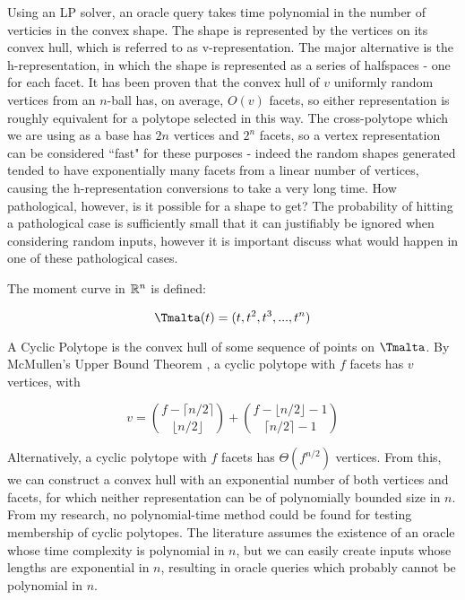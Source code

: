 Using an LP solver, an oracle query takes time polynomial in the number of verticies in the convex shape. The shape is represented by the vertices on its convex hull, which is referred to as v-representation. The major alternative is the h-representation, in which the shape is represented as a series of halfspaces - one for each facet. It has been proven \cite{Buchta85} that the convex hull of $v$ uniformly random vertices from an $n$-ball has, on average, $O(v)$ facets, so either representation is roughly equivalent for a polytope selected in this way. The cross-polytope which we are using as a base has $2n$ vertices and $2^n$ facets, so a vertex representation can be considered ``fast" for these purposes - indeed the random shapes generated tended to have exponentially many facets from a linear number of vertices, causing the h-representation conversions to take a very long time. How pathological, however, is it possible for a shape to get? The probability of hitting a pathological case is sufficiently small that it can justifiably be ignored when considering random inputs, however it is important discuss what would happen in one of these pathological cases.

The moment curve in $\mathbb{R}^n$ is defined:

$$
\tengm(t) = (t, t^2, t^3, ..., t^n)
$$

A Cyclic Polytope is the convex hull of some sequence of points on $\tengm$. By McMullen's Upper Bound Theorem \cite{McMullen70}, a cyclic polytope with $f$ facets has $v$ vertices, with

$$
v = {{f-\lceil n/2 \rceil}\choose{\lfloor {n/2} \rfloor}} + {{f-\lfloor n/2 \rfloor -1} \choose {\lceil {n/2} \rceil - 1}}
$$

Alternatively, a cyclic polytope with $f$ facets has $\Theta(f^{n/2})$ vertices. From this, we can construct a convex hull with an exponential number of both vertices and facets, for which neither representation can be of polynomially bounded size in $n$. From my research, no polynomial-time method could be found for testing membership of cyclic polytopes. The literature assumes the existence of an oracle whose time complexity is polynomial in $n$, but we can easily create inputs whose lengths are exponential in $n$, resulting in oracle queries which probably cannot be polynomial in $n$.